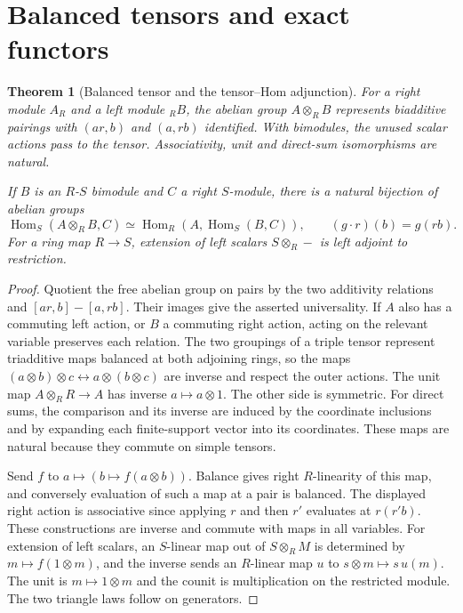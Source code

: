 \documentclass[11pt,oneside,openany]{book}
\newtheorem{theorem}{Theorem}[chapter]
\theoremstyle{definition}
\theoremstyle{remark}
\begin{document}
\section{Balanced tensors and exact functors}

\begin{theorem}[Balanced tensor and the tensor--Hom adjunction]
\label{p103:ALG-03-C02-S01}
For a right module \(A_R\) and a left module \({}_RB\), the
abelian group \(A\otimes_R B\) represents biadditive pairings
with \((ar,b)\) and \((a,rb)\) identified. With bimodules,
the unused scalar actions pass to the tensor. Associativity,
unit and direct-sum isomorphisms are natural.

If \(B\) is an \(R\)-\(S\) bimodule and \(C\) a right \(S\)-module,
there is a natural bijection of abelian groups
\[
 \operatorname{Hom}_S(A\otimes_R B,C)
 \simeq \operatorname{Hom}_R(A,\operatorname{Hom}_S(B,C)),\qquad
 (g\cdot r)(b)=g(rb).
\]
For a ring map \(R\to S\), extension of left scalars
\(S\otimes_R-\) is left adjoint to restriction.
\end{theorem}
\begin{proof}
Quotient the free abelian group on pairs by the two additivity
relations and \([ar,b]-[a,rb]\). Their images give the asserted
universality. If \(A\) also has a commuting left action, or \(B\)
a commuting right action, acting on the relevant variable preserves
each relation. The two groupings of a triple tensor represent
triadditive maps balanced at both adjoining rings, so the maps
\((a\otimes b)\otimes c\leftrightarrow a\otimes(b\otimes c)\)
are inverse and respect the outer actions. The unit map
\(A\otimes_R R\to A\) has inverse \(a\mapsto a\otimes1\).
The other side is symmetric. For direct sums, the comparison and
its inverse are induced by the coordinate inclusions and by
expanding each finite-support vector into its coordinates.
These maps are natural because they commute on simple tensors.

Send \(f\) to \(a\mapsto(b\mapsto f(a\otimes b))\).
Balance gives right \(R\)-linearity of this map, and conversely
evaluation of such a map at a pair is balanced. The displayed
right action is associative since applying \(r\) and then \(r'\)
evaluates at \(r(r'b)\). These constructions are inverse and
commute with maps in all variables. For extension of left scalars,
an \(S\)-linear map out of \(S\otimes_R M\) is determined by
\(m\mapsto f(1\otimes m)\), and the inverse sends an \(R\)-linear
map \(u\) to \(s\otimes m\mapsto s\,u(m)\). The unit is
\(m\mapsto1\otimes m\) and the counit is multiplication on the
restricted module. The two triangle laws follow on generators.
\end{proof}
\end{document}
